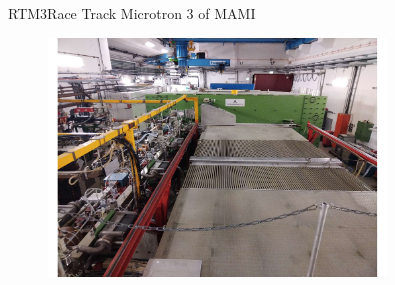 \documentclass[9pt,a4paper]{beamer}
\begin{document}
\begin{frame}{RTM3}{Race Track Microtron 3 of MAMI}

\begin{figure}[hbtp]
\centering
\includegraphics[width = 0.80\textwidth]{figures/Racetrack.pdf}
\end{figure}

\end{frame}
\end{document}

